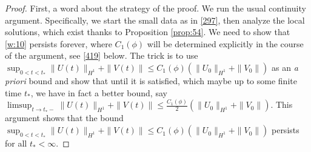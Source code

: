 \documentclass[10pt,a4paper]{amsart}
\newcommand{\f}[2]{\frac{#1}{#2}}
\begin{document}
\begin{proof} 
	First, a word about the strategy of the proof. We run the usual continuity argument. Specifically,  we start the small data as in \eqref{297}, then analyze the local solutions, which exist thanks to  Proposition \ref{prop:54}. We need to show that \eqref{w:10} persists forever, where $C_1(\phi)$ will be determined explicitly in the course of the argument, see \eqref{419} below.  The trick is to use \\  $\sup_{0<t<t_*}	\|U(t)\|_{H^1}+ \|V(t)\|\leq C_1(\phi)  (\|U_0\|_{H^1}+\|V_0\|)$ as an {\it a priori} bound and show that until it is satisfied, which maybe up to some finite time  $t_*$, we have in fact a better bound, say $\limsup_{t\to t_*-} \|U(t)\|_{H^1}+ \|V(t)\|\leq \f{C_1(\phi)}{2} (\|U_0\|_{H^1}+\|V_0\|)$. This argument shows that the bound $\sup_{0<t<t_*}	\|U(t)\|_{H^1}+ \|V(t)\|\leq C_1(\phi)  (\|U_0\|_{H^1}+\|V_0\|)$ persists for all $t_*<\infty$. 
	

\end{proof}
\end{document}
